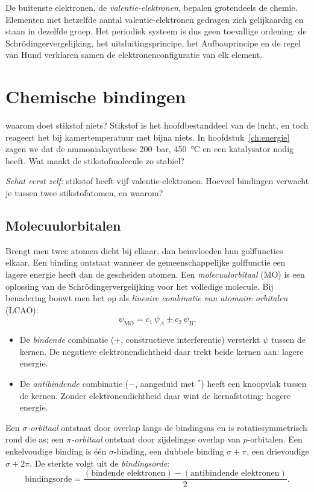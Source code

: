 De buitenste elektronen, de \emph{valentie-elektronen}, bepalen grotendeels de chemie. Elementen met hetzelfde aantal valentie-elektronen gedragen zich gelijkaardig en staan in dezelfde groep. Het periodiek systeem is dus geen toevallige ordening: de Schr\"odingervergelijking, het uitsluitingsprincipe, het Aufbauprincipe en de regel van Hund verklaren samen de elektronenconfiguratie van elk element.

\section{Chemische bindingen}

\begin{casus}{waarom doet stikstof niets?}
Stikstof is het hoofdbestanddeel van de lucht, en toch reageert het bij kamertemperatuur met bijna niets. In hoofdstuk~\ref{ch:energie} zagen we dat de ammoniaksynthese \SI{200}{\bar}, \SI{450}{\celsius} en een katalysator nodig heeft. Wat maakt de stikstofmolecule zo stabiel?

\emph{Schat eerst zelf:} stikstof heeft vijf valentie-elektronen. Hoeveel bindingen verwacht je tussen twee stikstofatomen, en waarom?
\end{casus}

\subsection{Molecuulorbitalen}
\label{sec:molecuulorbitalen}

Brengt men twee atomen dicht bij elkaar, dan beïnvloeden hun golffuncties elkaar. Een binding ontstaat wanneer de gemeenschappelijke golffunctie een lagere energie heeft dan de gescheiden atomen. Een \emph{molecuulorbitaal} (MO) is een oplossing van de Schr\"odingervergelijking voor het volledige molecule. Bij benadering bouwt men het op als \emph{lineaire combinatie van atomaire orbitalen} (LCAO):
\begin{equation}
\psi_{\text{MO}} = c_1\,\psi_A \pm c_2\,\psi_B .
\end{equation}
\begin{itemize}
\item De \emph{bindende} combinatie ($+$, constructieve interferentie) versterkt $\psi$ tussen de kernen. De negatieve elektronendichtheid daar trekt beide kernen aan: lagere energie.
\item De \emph{antibindende} combinatie ($-$, aangeduid met $^*$) heeft een knoopvlak tussen de kernen. Zonder elektronendichtheid daar wint de kernafstoting: hogere energie.
\end{itemize}
Een \emph{$\sigma$-orbitaal} ontstaat door overlap langs de bindingsas en is rotatiesymmetrisch rond die as; een \emph{$\pi$-orbitaal} ontstaat door zijdelingse overlap van $p$-orbitalen. Een enkelvoudige binding is één $\sigma$-binding, een dubbele binding $\sigma + \pi$, een drievoudige $\sigma + 2\pi$. De sterkte volgt uit de \emph{bindingsorde}:
\begin{equation*}
\text{bindingsorde} = \frac{(\text{bindende elektronen}) - (\text{antibindende elektronen})}{2}.
\end{equation*}

